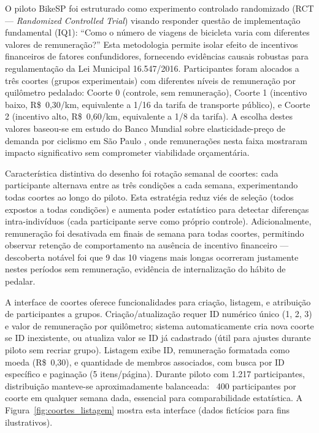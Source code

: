 

O piloto BikeSP foi estruturado como experimento controlado randomizado (RCT --- \textit{Randomized Controlled Trial}) visando responder questão de implementação fundamental (IQ1): ``Como o número de viagens de bicicleta varia com diferentes valores de remuneração?'' Esta metodologia permite isolar efeito de incentivos financeiros de fatores confundidores, fornecendo evidências causais robustas para regulamentação da Lei Municipal 16.547/2016. Participantes foram alocados a três coortes (grupos experimentais) com diferentes níveis de remuneração por quilômetro pedalado: Coorte 0 (controle, sem remuneração), Coorte 1 (incentivo baixo, R\$~0,30/km, equivalente a 1/16 da tarifa de transporte público), e Coorte 2 (incentivo alto, R\$~0,60/km, equivalente a 1/8 da tarifa). A escolha destes valores baseou-se em estudo do Banco Mundial sobre elasticidade-preço de demanda por ciclismo em São Paulo \citep{worldbank2022}, onde remunerações nesta faixa mostraram impacto significativo sem comprometer viabilidade orçamentária.

Característica distintiva do desenho foi rotação semanal de coortes: cada participante alternava entre as três condições a cada semana, experimentando todas coortes ao longo do piloto. Esta estratégia reduz viés de seleção (todos expostos a todas condições) e aumenta poder estatístico para detectar diferenças intra-indivíduos (cada participante serve como próprio controle). Adicionalmente, remuneração foi desativada em finais de semana para todas coortes, permitindo observar retenção de comportamento na ausência de incentivo financeiro --- descoberta notável foi que 9 das 10 viagens mais longas ocorreram justamente nestes períodos sem remuneração, evidência de internalização do hábito de pedalar.

A interface de coortes oferece funcionalidades para criação, listagem, e atribuição de participantes a grupos. Criação/atualização requer ID numérico único (1, 2, 3) e valor de remuneração por quilômetro; sistema automaticamente cria nova coorte se ID inexistente, ou atualiza valor se ID já cadastrado (útil para ajustes durante piloto sem recriar grupo). Listagem exibe ID, remuneração formatada como moeda (R\$~0,30), e quantidade de membros associados, com busca por ID específico e paginação (5 itens/página). Durante piloto com 1.217 participantes, distribuição manteve-se aproximadamente balanceada: ~400 participantes por coorte em qualquer semana dada, essencial para comparabilidade estatística. A Figura~\ref{fig:coortes_listagem} mostra esta interface (dados fictícios para fins ilustrativos).


